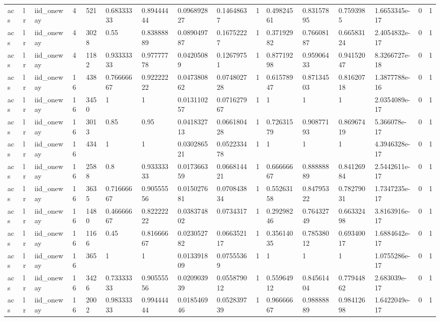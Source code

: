 \begin{tabular}{llllllllllllllll}
acs & lr & iid\_oneway & 4 & 521 & 0.68333333 & 0.89444444 & 0.096892827 & 0.14648637 & 1 & 0.49824561 & 0.83157895 & 0.7593985 & 1.6653345e-17 & 0 & 1 \\
acs & lr & iid\_oneway & 4 & 3028 & 0.55 & 0.83888889 & 0.089049787 & 0.16752227 & 1 & 0.37192982 & 0.76608187 & 0.66583124 & 2.4054832e-17 & 0 & 1 \\
acs & lr & iid\_oneway & 4 & 1182 & 0.93333333 & 0.97777778 & 0.04205089 & 0.12679751 & 1 & 0.87719298 & 0.95906433 & 0.94152047 & 8.3266727e-18 & 0 & 1 \\
acs & lr & iid\_oneway & 16 & 438 & 0.76666667 & 0.92222222 & 0.047380862 & 0.074802728 & 1 & 0.61578947 & 0.87134503 & 0.81620718 & 1.3877788e-16 & 0 & 1 \\
acs & lr & iid\_oneway & 16 & 3450 & 1 & 1 & 0.013110257 & 0.071627967 & 1 & 1 & 1 & 1 & 2.0354089e-17 & 0 & 1 \\
acs & lr & iid\_oneway & 16 & 3013 & 0.85 & 0.95 & 0.041832713 & 0.066180428 & 1 & 0.72631579 & 0.90877193 & 0.86967419 & 5.366078e-17 & 0 & 1 \\
acs & lr & iid\_oneway & 16 & 434 & 1 & 1 & 0.030286521 & 0.052233478 & 1 & 1 & 1 & 1 & 4.3946328e-17 & 0 & 1 \\
acs & lr & iid\_oneway & 16 & 2588 & 0.8 & 0.93333333 & 0.017366359 & 0.066814421 & 1 & 0.66666667 & 0.88888889 & 0.84126984 & 2.5442611e-17 & 0 & 1 \\
acs & lr & iid\_oneway & 16 & 3635 & 0.71666667 & 0.90555556 & 0.015027681 & 0.070843834 & 1 & 0.55263158 & 0.84795322 & 0.78279031 & 1.7347235e-17 & 0 & 1 \\
acs & lr & iid\_oneway & 16 & 1480 & 0.46666667 & 0.82222222 & 0.038374802 & 0.0734317 & 1 & 0.29298246 & 0.76432749 & 0.66332498 & 3.8163916e-17 & 0 & 1 \\
acs & lr & iid\_oneway & 16 & 1166 & 0.45 & 0.81666667 & 0.023052782 & 0.066352117 & 1 & 0.35614035 & 0.78538012 & 0.69340017 & 1.6884642e-17 & 0 & 1 \\
acs & lr & iid\_oneway & 16 & 365 & 1 & 1 & 0.013391809 & 0.07555369 & 1 & 1 & 1 & 1 & 1.0755286e-17 & 0 & 1 \\
acs & lr & iid\_oneway & 16 & 3426 & 0.73333333 & 0.90555556 & 0.020903939 & 0.055879012 & 1 & 0.55964912 & 0.84561404 & 0.77944862 & 2.683039e-17 & 0 & 1 \\
acs & lr & iid\_oneway & 16 & 2002 & 0.98333333 & 0.99444444 & 0.018546946 & 0.052839739 & 1 & 0.96666667 & 0.98888889 & 0.98412698 & 1.6422049e-17 & 0 & 1 \\

\end{tabular}
